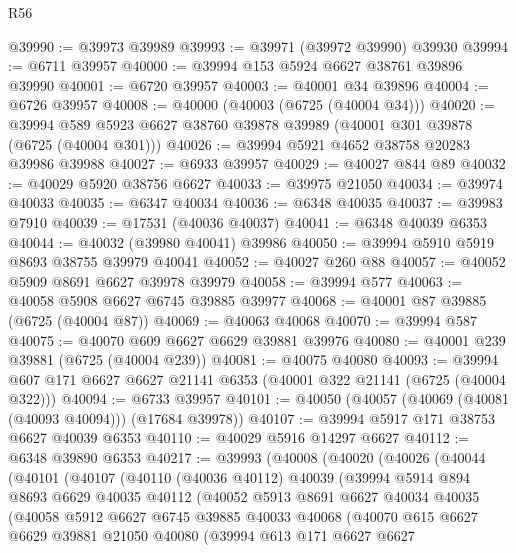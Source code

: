 \begin{lexlean}{R56}
\begin{coremodule}
@39990 := @39973 @39989
@39993 := @39971 (@39972 @39990) @39930
@39994 := @6711 @39957
@40000 := @39994 @153 @5924 @6627 @38761 @39896 @39990
@40001 := @6720 @39957
@40003 := @40001 @34 @39896
@40004 := @6726 @39957
@40008 := @40000 (@40003 (@6725 (@40004 @34)))
@40020 := @39994 @589 @5923 @6627 @38760 @39878 @39989 (@40001 @301 @39878 (@6725 (@40004 @301)))
@40026 := @39994 @5921 @4652 @38758 @20283 @39986 @39988
@40027 := @6933 @39957
@40029 := @40027 @844 @89
@40032 := @40029 @5920 @38756 @6627
@40033 := @39975 @21050
@40034 := @39974 @40033
@40035 := @6347 @40034
@40036 := @6348 @40035
@40037 := @39983 @7910
@40039 := @17531 (@40036 @40037)
@40041 := @6348 @40039 @6353
@40044 := @40032 (@39980 @40041) @39986
@40050 := @39994 @5910 @5919 @8693 @38755 @39979 @40041
@40052 := @40027 @260 @88
@40057 := @40052 @5909 @8691 @6627 @39978 @39979
@40058 := @39994 @577
@40063 := @40058 @5908 @6627 @6745 @39885 @39977
@40068 := @40001 @87 @39885 (@6725 (@40004 @87))
@40069 := @40063 @40068
@40070 := @39994 @587
@40075 := @40070 @609 @6627 @6629 @39881 @39976
@40080 := @40001 @239 @39881 (@6725 (@40004 @239))
@40081 := @40075 @40080
@40093 := @39994 @607 @171 @6627 @6627 @21141 @6353 (@40001 @322 @21141 (@6725 (@40004 @322)))
@40094 := @6733 @39957
@40101 := @40050 (@40057 (@40069 (@40081 (@40093 @40094))) (@17684 @39978))
@40107 := @39994 @5917 @171 @38753 @6627 @40039 @6353
@40110 := @40029 @5916 @14297 @6627
@40112 := @6348 @39890 @6353
@40217 := @39993
    (@40008
      (@40020
        (@40026
          (@40044
            (@40101
              (@40107
                (@40110
                  (@40036 @40112)
                  @40039
                  (@39994
                    @5914
                    @894
                    @8693
                    @6629
                    @40035
                    @40112
                    (@40052
                      @5913
                      @8691
                      @6627
                      @40034
                      @40035
                      (@40058
                        @5912
                        @6627
                        @6745
                        @39885
                        @40033
                        @40068
                        (@40070
                          @615
                          @6627
                          @6629
                          @39881
                          @21050
                          @40080
                          (@39994
                            @613
                            @171
                            @6627
                            @6627

\end{coremodule}
\end{lexlean}

